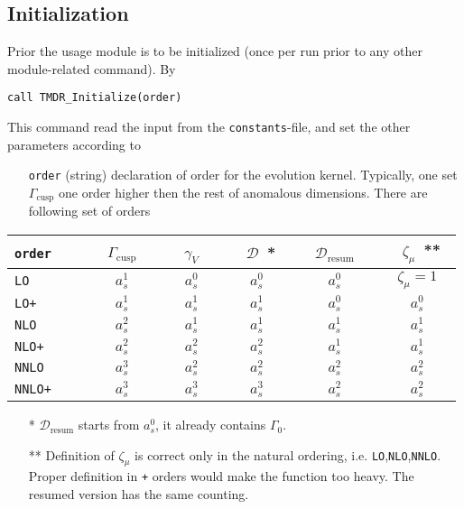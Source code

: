 \documentclass[prd,nofootinbib,eqsecnum,final]{revtex4}
\renewcommand{\(}{\left(}
\renewcommand{\)}{\right)}
\renewcommand{\[}{\left[}
\renewcommand{\]}{\right]}
\begin{document}
\subsection{Initialization}
\label{TMDR:init}

Prior the usage module is to be initialized (once per run prior to any other module-related command). By

\texttt{call TMDR{\_}Initialize(order)}

This command read the input from the \texttt{constants}-file, and set the other parameters according to 
\begin{itemize}

\item[\texttt{order}] (string) declaration of order for the evolution kernel. Typically, one set $\Gamma_{\text{cusp}}$ one order higher then the rest of anomalous dimensions. There are following set of orders
\end{itemize}

\begin{center}

\begin{tabular}{|l||c|c|c||c|| c}
\texttt{order}~~~ & ~~$\Gamma_{\text{cusp}}$~~ & ~~$\gamma_V$~~ & ~~$\mathcal{D}$~*~ & ~~$\mathcal{D}_{\text{resum}}$~~ & ~~$\zeta_\mu$~**~
\\\hline\hline
\texttt{LO} & $a_s^1$ & $a_s^0$ & $a_s^0$ & $a_s^0$ & $\zeta_\mu=1$ 
\\\hline
\texttt{LO+} & $a_s^1$ & $a_s^1$ & $a_s^1$ & $a_s^0$ & $a_s^0$ 
\\\hline
\texttt{NLO} & $a_s^2$ & $a_s^1$ & $a_s^1$ & $a_s^1$ & $a_s^1$ 
\\\hline
\texttt{NLO+} & $a_s^2$ & $a_s^2$ & $a_s^2$ & $a_s^1$ & $a_s^1$ 
\\\hline
\texttt{NNLO} & $a_s^3$ & $a_s^2$ & $a_s^2$ & $a_s^2$ & $a_s^2$ 
\\\hline
\texttt{NNLO+} & $a_s^3$ & $a_s^3$ & $a_s^3$ & $a_s^2$ & $a_s^2$ 
\\\hline
\end{tabular}

\end{center}

\begin{itemize}
\item[*] $\mathcal{D}_{\text{resum}}$ starts from $a_s^0$, it already contains $\Gamma_0$.
\item[**] Definition of $\zeta_\mu$ is correct only in the natural ordering, i.e. \texttt{LO},\texttt{NLO},\texttt{NNLO}. Proper definition in \texttt{+} orders would make the function too heavy. The resumed version has the same counting.
\end{itemize}
\end{document}
